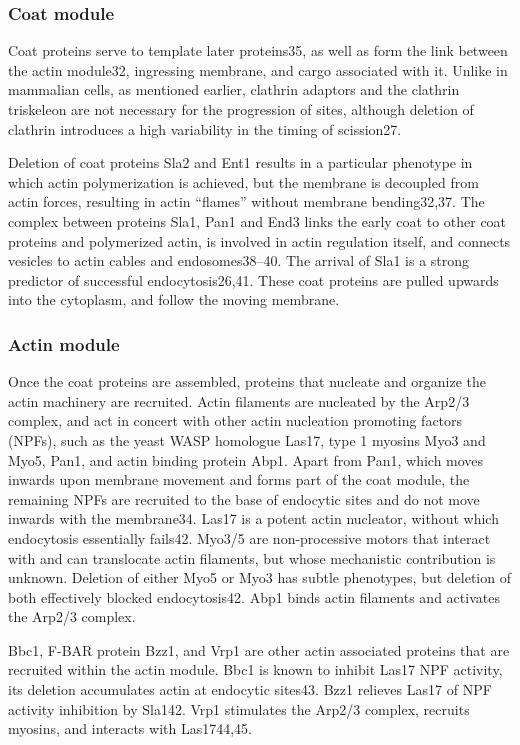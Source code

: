 			
			\subsubsection{Coat module}
			Coat proteins serve to template later proteins35, as well as form the link between the actin module32, ingressing membrane, and cargo associated with it. Unlike in mammalian cells, as mentioned earlier, clathrin adaptors and the clathrin triskeleon are not necessary for the progression of sites, although deletion of clathrin introduces a high variability in the timing of scission27. 
			
			\vspace{5mm}
			Deletion of coat proteins Sla2 and Ent1 results in a particular phenotype in which actin polymerization is achieved, but the membrane is decoupled from actin forces, resulting in actin “flames” without membrane bending32,37. The complex between proteins Sla1, Pan1 and End3 links the early coat to other coat proteins and polymerized actin, is involved in actin regulation itself, and connects vesicles to actin cables and endosomes38–40. The arrival of Sla1 is a strong predictor of successful endocytosis26,41. These coat proteins are pulled upwards into the cytoplasm, and follow the moving membrane.



			\subsubsection{Actin module}
			Once the coat proteins are assembled, proteins that nucleate and organize the actin machinery are recruited. Actin filaments are nucleated by the Arp2/3 complex, and act in concert with other actin nucleation promoting factors (NPFs), such as the yeast WASP homologue Las17, type 1 myosins Myo3 and Myo5, Pan1, and actin binding protein Abp1. Apart from Pan1, which moves inwards upon membrane movement and forms part of the coat module, the remaining NPFs are recruited to the base of endocytic sites and do not move inwards with the membrane34. Las17 is a potent actin nucleator, without which endocytosis essentially fails42. Myo3/5 are non-processive motors that interact with and can translocate actin filaments, but whose mechanistic contribution is unknown. Deletion of either Myo5 or Myo3 has subtle phenotypes, but deletion of both effectively blocked endocytosis42. Abp1 binds actin filaments and activates the Arp2/3 complex. 

			\vspace{5mm}
			Bbc1, F-BAR protein Bzz1, and Vrp1 are other actin associated proteins that are recruited within the actin module. Bbc1 is known to inhibit Las17 NPF activity, its deletion accumulates actin at endocytic sites43. Bzz1 relieves Las17 of NPF activity inhibition by Sla142. Vrp1 stimulates the Arp2/3 complex, recruits myosins, and interacts with Las1744,45. 


